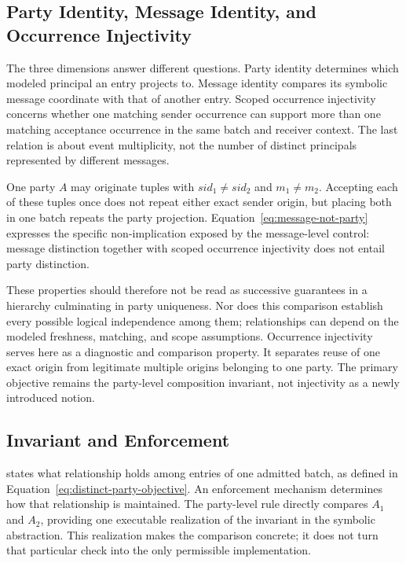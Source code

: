 \subsection{Party Identity, Message Identity, and Occurrence Injectivity}

The three dimensions answer different questions. Party identity determines
which modeled principal an entry projects to. Message identity compares its
symbolic message coordinate with that of another entry. Scoped occurrence
injectivity concerns whether one matching sender occurrence can support more
than one matching acceptance occurrence in the same batch and receiver
context. The last relation is about event multiplicity, not the number of
distinct principals represented by different messages.

One party \(A\) may originate tuples with
\(\mathit{sid}_1\neq\mathit{sid}_2\) and \(m_1\neq m_2\). Accepting each of
these tuples once does not repeat either exact sender origin, but placing
both in one batch repeats the party projection. Equation~\eqref{eq:message-not-party}
expresses the specific non-implication exposed by the message-level control:
message distinction together with scoped occurrence injectivity does not
entail party distinction.

These properties should therefore not be read as successive guarantees in a
hierarchy culminating in party uniqueness. Nor does this comparison establish
every possible logical independence among them; relationships can depend on
the modeled freshness, matching, and scope assumptions. Occurrence
injectivity serves here as a diagnostic and comparison property. It separates
reuse of one exact origin from legitimate multiple origins belonging to one
party. The primary objective remains the party-level composition invariant,
not injectivity as a newly introduced notion.

\subsection{Invariant and Enforcement}

\distinctparty states what relationship holds among entries of one admitted
batch, as defined in Equation~\eqref{eq:distinct-party-objective}. An
enforcement mechanism determines how that relationship is maintained. The
party-level rule directly compares \(A_1\) and \(A_2\), providing one
executable realization of the invariant in the symbolic abstraction. This
realization makes the comparison concrete; it does not turn that particular
check into the only permissible implementation.

